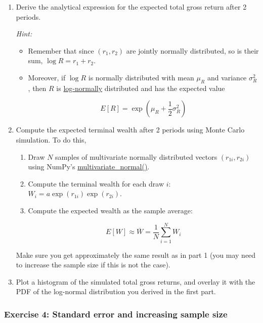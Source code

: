 \documentclass{scrartcl}
\begin{document}
\begin{enumerate}
\def\labelenumi{\arabic{enumi}.}
\item
  Derive the analytical expression for the expected total gross return
  after 2 periods.

  \emph{Hint:}

  \begin{itemize}
  \item
    Remember that since \((r_1,r_2)\) are jointly normally distributed,
    so is their sum, \(\log R = r_1 + r_2\).
  \item
    Moreover, if \(\log R\) is normally distributed with mean \(\mu_R\)
    and variance \(\sigma_R^2\), then \(R\) is
    \href{https://en.wikipedia.org/wiki/Log-normal_distribution}{log-normally}
    distributed and has the expected value

    \[E[R] = \exp\left(\mu_R + \frac{1}{2}\sigma_R^2 \right)\]
  \end{itemize}
\item
  Compute the expected terminal wealth after 2 periods using Monte Carlo
  simulation. To do this,

  \begin{enumerate}
  \def\labelenumii{\arabic{enumii}.}
  \item
    Draw \(N\) samples of multivariate normally distributed vectors
    \((r_{1i},r_{2i})\) using NumPy's
    \href{https://numpy.org/doc/stable/reference/random/generated/numpy.random.multivariate_normal.html}{multivariate\_normal()}.
  \item
    Compute the terminal wealth for each draw \(i\):
    \(W_i = a\exp(r_{1i})\exp(r_{2i})\).
  \item
    Compute the expected wealth as the sample average:

    \[E[W] \approx \overline{W} = \frac{1}{N}\sum_{i=1}^N W_i\]
  \end{enumerate}

  Make sure you get approximately the same result as in part 1 (you may
  need to increase the sample size if this is not the case).
\item
  Plot a histogram of the simulated total gross returns, and overlay it
  with the PDF of the log-normal distribution you derived in the first
  part.
\end{enumerate}

    \hypertarget{exercise-4-standard-error-and-increasing-sample-size}{%
\subsubsection{Exercise 4: Standard error and increasing sample
size}\label{exercise-4-standard-error-and-increasing-sample-size}}
\end{document}

